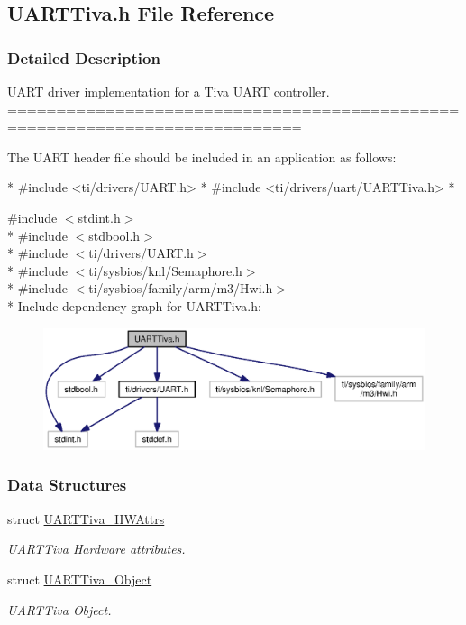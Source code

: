 \subsection{U\-A\-R\-T\-Tiva.\-h File Reference}
\label{_u_a_r_t_tiva_8h}


\subsubsection{Detailed Description}
U\-A\-R\-T driver implementation for a Tiva U\-A\-R\-T controller. ============================================================================

The U\-A\-R\-T header file should be included in an application as follows\-: 
\begin{DoxyCode}
*  #include <ti/drivers/UART.h>
*  #include <ti/drivers/uart/UARTTiva.h>
*  
\end{DoxyCode}
 

{\ttfamily \#include $<$stdint.\-h$>$}\\*
{\ttfamily \#include $<$stdbool.\-h$>$}\\*
{\ttfamily \#include $<$ti/drivers/\-U\-A\-R\-T.\-h$>$}\\*
{\ttfamily \#include $<$ti/sysbios/knl/\-Semaphore.\-h$>$}\\*
{\ttfamily \#include $<$ti/sysbios/family/arm/m3/\-Hwi.\-h$>$}\\*
Include dependency graph for U\-A\-R\-T\-Tiva.\-h\-:
\nopagebreak
\begin{figure}[H]
\begin{center}
\leavevmode
\includegraphics[width=350pt]{_u_a_r_t_tiva_8h__incl}
\end{center}
\end{figure}
\subsubsection*{Data Structures}
\begin{DoxyCompactItemize}
\item 
struct \hyperlink{struct_u_a_r_t_tiva___h_w_attrs}{U\-A\-R\-T\-Tiva\-\_\-\-H\-W\-Attrs}
\begin{DoxyCompactList}\small\item\em U\-A\-R\-T\-Tiva Hardware attributes. \end{DoxyCompactList}\item 
struct \hyperlink{struct_u_a_r_t_tiva___object}{U\-A\-R\-T\-Tiva\-\_\-\-Object}
\begin{DoxyCompactList}\small\item\em U\-A\-R\-T\-Tiva Object. \end{DoxyCompactList}\end{DoxyCompactItemize}
